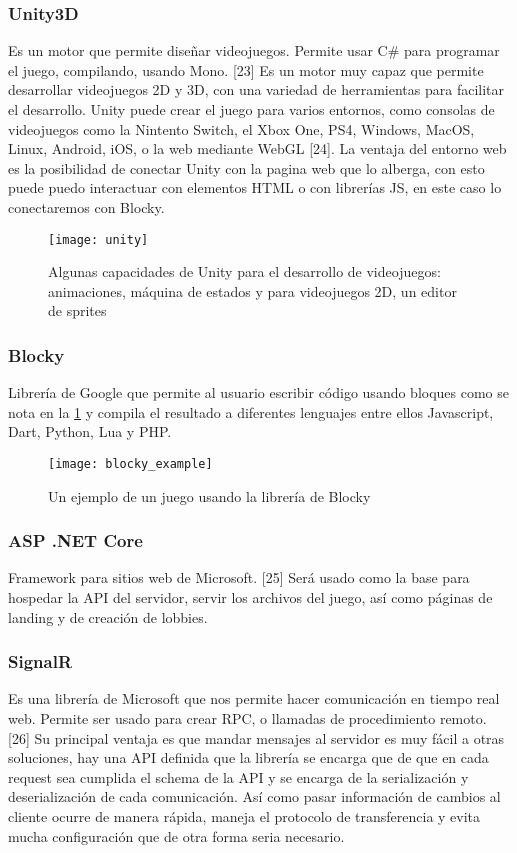 \subsubsection{Unity3D}
Es un motor que permite diseñar videojuegos. Permite usar C# para programar el juego, compilando, usando Mono. [23] Es un motor muy capaz que permite desarrollar videojuegos 2D y 3D, con una variedad de herramientas para facilitar el desarrollo.
Unity puede crear el juego para varios entornos, como consolas de videojuegos como la Nintento Switch, el Xbox One, PS4, Windows, MacOS, Linux, Android, iOS, o la web mediante WebGL [24]. La ventaja del entorno web es la posibilidad de conectar Unity con la pagina web que lo alberga, con esto puede puedo interactuar con elementos HTML o con librerías JS, en este caso lo conectaremos con Blocky.
\begin{figure}
    \caption{Algunas capacidades de Unity para el desarrollo de videojuegos: animaciones, máquina de estados y para videojuegos 2D, un editor de sprites}
    \centering
    \texttt{[image: unity]}
\end{figure}

\subsubsection{Blocky}
Librería de Google que permite al usuario escribir código usando bloques como se nota en la \ref{fig:blocky_example} y compila el resultado a diferentes lenguajes entre ellos Javascript, Dart, Python, Lua y PHP.

\begin{figure}
    \caption{Un ejemplo de un juego usando la librería de Blocky}
    \centering
    \texttt{[image: blocky\_example]}
    \label{fig:blocky_example}
\end{figure}

\subsubsection{ASP .NET Core}
Framework para sitios web de Microsoft. [25] Será usado como la base para hospedar la API del servidor, servir los archivos del juego, así como páginas de landing y de creación de lobbies.

\subsubsection{SignalR}
Es una librería de Microsoft que nos permite hacer comunicación en tiempo real web. Permite ser usado para crear RPC, o llamadas de procedimiento remoto. [26] Su principal ventaja es que mandar mensajes al servidor es muy fácil a otras soluciones, hay una API definida que la librería se encarga que de que en cada request sea cumplida el schema de la API y se encarga de la serialización y deserialización de cada comunicación. Así como pasar información de cambios al cliente ocurre de manera rápida, maneja el protocolo de transferencia y evita mucha configuración que de otra forma seria necesario.

